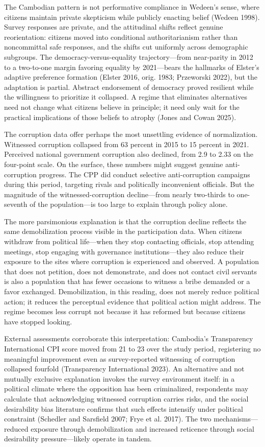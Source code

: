 \documentclass[Review,times,sageh,doublespace]{sagej}
\begin{document}
The Cambodian pattern is not performative compliance in Wedeen's sense,
where citizens maintain private skepticism while publicly enacting
belief (Wedeen 1998). Survey responses are private, and the attitudinal
shifts reflect genuine reorientation: citizens moved into conditional
authoritarianism rather than noncommittal safe responses, and the shifts
cut uniformly across demographic subgroups. The
democracy-versus-equality trajectory---from near-parity in 2012 to a
two-to-one margin favoring equality by 2021---bears the hallmarks of
Elster's adaptive preference formation (Elster 2016, orig. 1983;
Przeworski 2022), but the adaptation is partial. Abstract endorsement of
democracy proved resilient while the willingness to prioritize it
collapsed. A regime that eliminates alternatives need not change what
citizens believe in principle; it need only wait for the practical
implications of those beliefs to atrophy (Jones and Cowan 2025).

The corruption data offer perhaps the most unsettling evidence of
normalization. Witnessed corruption collapsed from 63 percent in 2015 to
15 percent in 2021. Perceived national government corruption also
declined, from 2.9 to 2.33 on the four-point scale. On the surface,
these numbers might suggest genuine anti-corruption progress. The CPP
did conduct selective anti-corruption campaigns during this period,
targeting rivals and politically inconvenient officials. But the
magnitude of the witnessed-corruption decline---from nearly two-thirds
to one-seventh of the population---is too large to explain through
policy alone.

The more parsimonious explanation is that the corruption decline
reflects the same demobilization process visible in the participation
data. When citizens withdraw from political life---when they stop
contacting officials, stop attending meetings, stop engaging with
governance institutions---they also reduce their exposure to the sites
where corruption is experienced and observed. A population that does not
petition, does not demonstrate, and does not contact civil servants is
also a population that has fewer occasions to witness a bribe demanded
or a favor exchanged. Demobilization, in this reading, does not merely
reduce political action; it reduces the perceptual evidence that
political action might address. The regime becomes less corrupt not
because it has reformed but because citizens have stopped looking.

External assessments corroborate this interpretation: Cambodia's
Transparency International CPI score moved from 21 to 23 over the study
period, registering no meaningful improvement even as survey-reported
witnessing of corruption collapsed fourfold (Transparency International
2023). An alternative and not mutually exclusive explanation invokes the
survey environment itself: in a political climate where the opposition
has been criminalized, respondents may calculate that acknowledging
witnessed corruption carries risks, and the social desirability bias
literature confirms that such effects intensify under political
constraint (Schedler and Sarsfield 2007; Frye et al. 2017). The two
mechanisms---reduced exposure through demobilization and increased
reticence through social desirability pressure---likely operate in
tandem.
\end{document}
